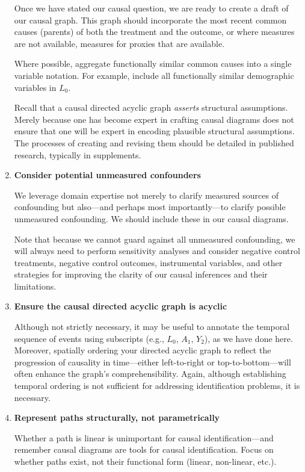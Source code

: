 \documentclass[
  single column]{article}
\begin{document}
\begin{enumerate}
  Once we have stated our causal question, we are ready to create a
  draft of our causal graph. This graph should incorporate the most
  recent common causes (parents) of both the treatment and the outcome,
  or where measures are not available, measures for proxies that are
  available.

  Where possible, aggregate functionally similar common causes into a
  single variable notation. For example, include all functionally
  similar demographic variables in \(L_0\).

  Recall that a causal directed acyclic graph \emph{asserts} structural
  assumptions. Merely because one has become expert in crafting causal
  diagrams does not ensure that one will be expert in encoding plausible
  structural assumptions. The processes of creating and revising them
  should be detailed in published research, typically in supplements.
\item
  \textbf{Consider potential unmeasured confounders}

  We leverage domain expertise not merely to clarify measured sources of
  confounding but also---and perhaps most importantly---to clarify
  possible unmeasured confounding. We should include these in our causal
  diagrams.

  Note that because we cannot guard against all unmeasured confounding,
  we will always need to perform sensitivity analyses and consider
  negative control treatments, negative control outcomes, instrumental
  variables, and other strategies for improving the clarity of our
  causal inferences and their limitations.
\item
  \textbf{Ensure the causal directed acyclic graph is acyclic}

  Although not strictly necessary, it may be useful to annotate the
  temporal sequence of events using subscripts (e.g., \(L_0\), \(A_1\),
  \(Y_2\)), as we have done here. Moreover, spatially ordering your
  directed acyclic graph to reflect the progression of causality in
  time---either left-to-right or top-to-bottom---will often enhance the
  graph's comprehensibility. Again, although establishing temporal
  ordering is not sufficient for addressing identification problems, it
  is necessary.
\item
  \textbf{Represent paths structurally, not parametrically}

  Whether a path is linear is unimportant for causal
  identification---and remember causal diagrams are tools for causal
  identification. Focus on whether paths exist, not their functional
  form (linear, non-linear, etc.).


\end{enumerate}
\end{document}
